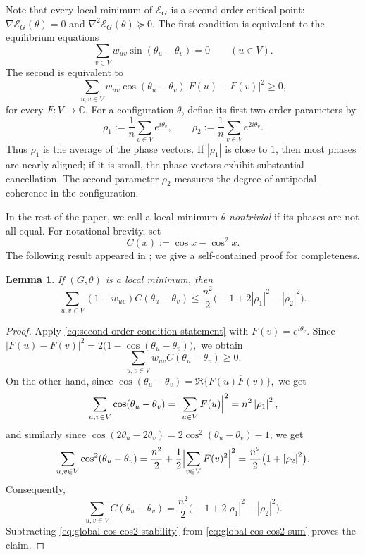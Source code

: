 \documentclass[reqno,11pt]{amsart}
\newtheorem{lemma}{Lemma}
\theoremstyle{definition}
\newcommand{\CC}{\mathbb{C}}
\newcommand{\abs}[1]{\left\lvert #1\right\rvert}
\begin{document}
Note that every local minimum of $\mathcal{E}_G$ is a second-order critical point:
$\nabla\mathcal E_G(\theta)=0$ and
$\nabla^2\mathcal E_G(\theta)\succeq0$.  The first condition is equivalent
to the equilibrium equations
\begin{equation}\label{eq:first-order-condition-statement}
    \sum_{v\in V}w_{uv}\sin(\theta_u-\theta_v)=0
    \qquad (u\in V).
\end{equation}
The second is equivalent to
\begin{equation}\label{eq:second-order-condition-statement}
    \sum_{u,v\in V}w_{uv}\cos(\theta_u-\theta_v)
        \abs{F(u)-F(v)}^2\ge 0,
\end{equation}
for every $F\colon V\to\CC$. For a configuration $\theta$, define its first two order parameters by
\begin{equation}\label{eq:order-parameters}
    \rho_1:=\frac1n\sum_{v\in V}e^{i\theta_v},
    \qquad
    \rho_2:=\frac1n\sum_{v\in V}e^{2i\theta_v}.
\end{equation}
Thus $\rho_1$ is the average of the phase vectors.  If
$\abs{\rho_1}$ is close to $1$, then most phases are nearly aligned;
if it is small, the phase vectors exhibit substantial cancellation.
The second parameter $\rho_2$ measures the degree of antipodal coherence in the configuration. 


In the rest of the paper, we call a local minimum $\theta$ \emph{nontrivial} if its phases are not
all equal. For notational brevity, set
\[
    C(x):=\cos x-\cos^2x.
\]
The following result appeared in \cite[Equation~6]{kassabov-strogatz-townsend-dense}; we give a self-contained proof for completeness.
\begin{lemma}\label{lem:global-complement-c-sum-ub}
If $(G,\theta)$ is a local minimum, then
\[
    \sum_{u,v\in V}(1-w_{uv})C(\theta_u-\theta_v)
    \le \frac{n^2}{2}
       \bigl(-1+2\abs{\rho_1}^2-\abs{\rho_2}^2\bigr).
\]
\end{lemma}

\begin{proof}
Apply \eqref{eq:second-order-condition-statement} with $F(v)=e^{i\theta_v}$. Since $ \abs{F(u) - F(v)}^2
    =2\bigl(1-\cos(\theta_u-\theta_v)\bigr),$ we obtain
\begin{equation}\label{eq:global-cos-cos2-stability}
    \sum_{u,v\in V}w_{uv}C(\theta_u-\theta_v)\ge0.
\end{equation}
On the other hand, since $\cos(\theta_u - \theta_v) = \Re \{F(u)\overline F(v)\},$ we get
\[
\sum_{u,v\in V}\cos(\theta_u-\theta_v)
    =\Bigl|\sum_{u \in V} F(u)\Bigr|^2
    =n^2\abs{\rho_1}^2,
\]
and similarly since $\cos(2\theta_u - 2\theta_v) = 2\cos^2(\theta_u - \theta_v) - 1$, we get
\[
\sum_{u,v\in V}\cos^2(\theta_u-\theta_v)
    =\frac{n^2}{2}
      +\frac12\Bigl|\sum_{v\in V}F(v)^2\Bigr|^2
    =\frac{n^2}{2}\bigl(1+\abs{\rho_2}^2\bigr).
\]
Consequently, 
\begin{equation}\label{eq:global-cos-cos2-sum}
\sum_{u,v\in V}C(\theta_u-\theta_v)
  =\frac{n^2}{2}
    \bigl(-1+2\abs{\rho_1}^2-\abs{\rho_2}^2\bigr).
\end{equation}
Subtracting \eqref{eq:global-cos-cos2-stability} from
\eqref{eq:global-cos-cos2-sum} proves the claim.
\end{proof}
\end{document}
